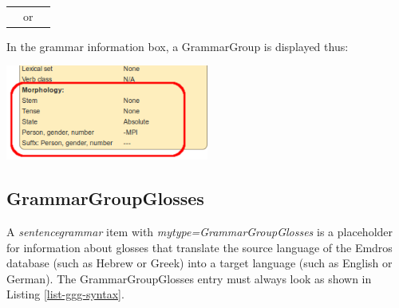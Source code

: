\documentclass[11pt,oneside,a4paper]{memoir}
\begin{document}
\begin{center}
\begin{tabular}{rcl}
  \vspace{0pt}\parbox{0.3\textwidth}{\includegraphics[width=0.3\textwidth]{morph1a.png}} %
 & or &
  \vspace{0pt}\parbox{0.3\textwidth}{\includegraphics[width=0.3\textwidth]{morph1b.png}}
\end{tabular}
\end{center}

\Needspace*{5cm}%
In the grammar information box, a GrammarGroup is displayed thus:

\begin{center}
  \includegraphics[width=0.5\textwidth]{morph2.png}
\end{center}


\subsection{GrammarGroupGlosses}\label{sec-grammargroupglosses}
 
A \emph{sentencegrammar} item with \emph{mytype=GrammarGroupGlosses} is a placeholder for
information about glosses that translate the source language of the Emdros database (such as Hebrew
or Greek) into a target language (such as English or German). The GrammarGroupGlosses entry must
always look as shown in Listing \ref{list-ggg-syntax}.
 
\end{document}
